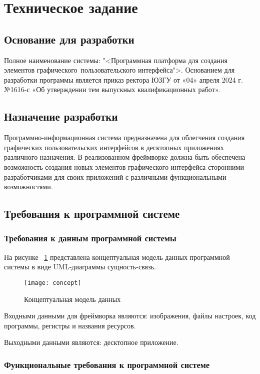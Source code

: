 \section{Техническое задание}
\subsection{Основание для разработки}

Полное наименование системы: "<Программная платформа для создания элементов графического\ пользовательского интерфейса">.
Основанием для разработки программы является приказ ректора ЮЗГУ от «04» апреля 2024 г. №1616-с «Об утверждении тем выпускных квалификационных работ».

\subsection{Назначение разработки}

Программно-информационная система предназначена для облегчения создания графических пользовательских интерфейсов в десктопных приложениях различного назначения.
В реализованном фреймворке должна быть обеспечена возможность создания новых элементов графического интерфейса сторонними разработчиками для своих приложений с различными функциональными возможностями.

\subsection{Требования к программной системе}

\subsubsection{Требования к данным программной системы}

На рисунке ~\ref{сoncept:image} представлена концептуальная модель данных программной системы в виде UML-диаграммы сущность-связь.

\begin{figure}[H]
	\texttt{[image: сoncept]}
	\caption{Концептуальная модель данных}
	\label{сoncept:image}
\end{figure}

Входными данными для фреймворка являются: изображения, файлы настроек, код программы, регистры и названия ресурсов.

Выходными данными являются: десктопное приложение.

\subsubsection{Функциональные требования к программной системе}

